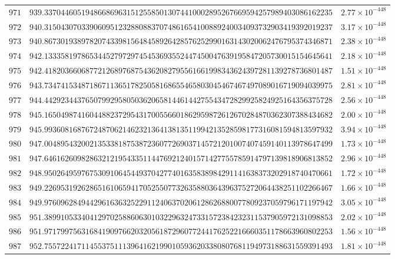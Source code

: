 \documentclass[12pt,reqno]{amsart}
\theoremstyle{remark}
\begin{document}
\begin{longtable}{clc}
$971$ & $939.3370446051948668696315125585013074410002895267669594257989403086162235$ & $2.77\times 10^{-448}$ \\
$972$ & $940.3150430703390609512328808837074861654100889240034093732903419392019237$ & $3.17\times 10^{-448}$ \\
$973$ & $940.8673019389782074339815648458926428576252990163143020062476795374346871$ & $2.38\times 10^{-448}$ \\
$974$ & $942.1333581978653445279729745453693552447450047639195847205730015154645641$ & $2.18\times 10^{-448}$ \\
$975$ & $942.4182036606877212689768754362082795561661998343624397281139278736801487$ & $1.51\times 10^{-448}$ \\
$976$ & $943.7347415348718671136517825058168655465803045467467497089016719094039975$ & $2.81\times 10^{-448}$ \\
$977$ & $944.4429234437650799295805036206581446144275543472829925824925164356375728$ & $2.56\times 10^{-448}$ \\
$978$ & $945.1650498741604488237295431700556601862959872612670284870362307388434682$ & $2.00\times 10^{-448}$ \\
$979$ & $945.9936081687672487062146232136413813511994213528598177316081594813597932$ & $3.94\times 10^{-448}$ \\
$980$ & $947.0048954320021353381875387236077269037145721201007407459140113978647499$ & $1.73\times 10^{-448}$ \\
$981$ & $947.6461626098286321219543351144769212401571427755785914797139818906813852$ & $2.96\times 10^{-448}$ \\
$982$ & $948.9502649597675309106454493704277401635838984291141638373202918740470661$ & $1.72\times 10^{-448}$ \\
$983$ & $949.2269531926286516106594170525507732635880364396375272064438251102266467$ & $1.66\times 10^{-448}$ \\
$984$ & $949.9760962849442961636325229112406370206128626880077809237059796171197942$ & $3.05\times 10^{-448}$ \\
$985$ & $951.3899105334041297025886063010322963247331572384232311537905972131098853$ & $2.02\times 10^{-448}$ \\
$986$ & $951.9717997563168419097662032056187296077244176252216660351178663960802253$ & $1.56\times 10^{-448}$ \\
$987$ & $952.7557224171145537511139641621990105936203380807681194973188631559391493$ & $1.81\times 10^{-448}$ \\

\end{longtable}
\end{document}
